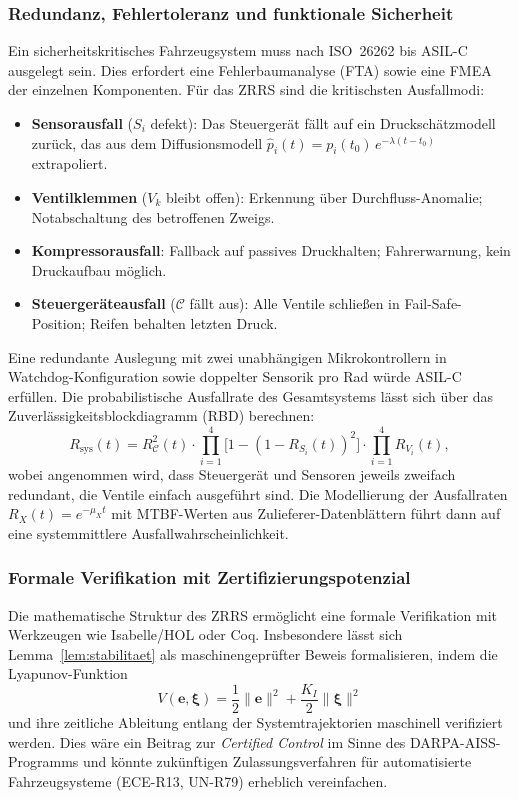﻿\documentclass[a4paper,12pt]{article}
\theoremstyle{definition}
\begin{document}
\subsubsection{Redundanz, Fehlertoleranz und funktionale Sicherheit}

Ein sicherheitskritisches Fahrzeugsystem muss nach ISO~26262 bis ASIL-C
ausgelegt sein. Dies erfordert eine Fehler\-baum\-analyse (FTA) sowie
eine FMEA der einzelnen Komponenten. Für das ZRRS sind die
kritischsten Ausfallmodi:

\begin{itemize}
    \item \textbf{Sensorausfall} ($S_i$ defekt): Das Steuergerät fällt auf
    ein Druckschätzmodell zurück, das aus dem Diffusionsmodell
    $\hat{p}_i(t) = p_i(t_0)\,e^{-\lambda(t-t_0)}$ extrapoliert.
    \item \textbf{Ventilklemmen} ($V_k$ bleibt offen): Erkennung über
    Durchfluss-Anomalie; Notabschaltung des betroffenen Zweigs.
    \item \textbf{Kompressorausfall}: Fallback auf passives Druckhalten;
    Fahrerwarnung, kein Druckaufbau möglich.
    \item \textbf{Steuergeräteausfall} ($\mathcal{C}$ fällt aus): Alle
    Ventile schließen in Fail-Safe-Position; Reifen behalten letzten Druck.
\end{itemize}

Eine redundante Auslegung mit zwei unabhängigen Mikrokontrollern in
Watchdog-Konfiguration sowie doppelter Sensorik pro Rad würde ASIL-C
erfüllen. Die probabilistische Ausfallrate des Gesamtsystems lässt sich
über das Zuverlässigkeitsblockdiagramm (RBD) berechnen:
\[
    R_{\text{sys}}(t) = R_{\mathcal{C}}^2(t) \cdot
    \prod_{i=1}^{4} \bigl[1 - (1-R_{S_i}(t))^2\bigr] \cdot
    \prod_{i=1}^{4} R_{V_i}(t),
\]
wobei angenommen wird, dass Steuergerät und Sensoren jeweils zweifach
redundant, die Ventile einfach ausgeführt sind. Die Modellierung
der Ausfallraten $R_X(t) = e^{-\mu_X t}$ mit MTBF-Werten aus
Zulieferer-Datenblättern führt dann auf eine systemmittlere
Ausfallwahrscheinlichkeit.

\subsubsection{Formale Verifikation mit Zertifizierungspotenzial}

Die mathematische Struktur des ZRRS ermöglicht eine formale Verifikation
mit Werkzeugen wie Isabelle/HOL oder Coq. Insbesondere lässt sich
Lemma~\ref{lem:stabilitaet} als maschinengeprüfter Beweis formalisieren,
indem die Lyapunov-Funktion
\[
    V(\mathbf{e}, \boldsymbol{\xi}) = \frac{1}{2}\|\mathbf{e}\|^2
    + \frac{K_I}{2}\|\boldsymbol{\xi}\|^2
\]
und ihre zeitliche Ableitung entlang der Systemtrajektorien maschinell
verifiziert werden. Dies wäre ein Beitrag zur \emph{Certified Control}
im Sinne des DARPA-AISS-Programms und könnte zukünftigen
Zulassungsverfahren für automatisierte Fahrzeugsysteme (ECE-R13, UN-R79)
erheblich vereinfachen.
\end{document}

